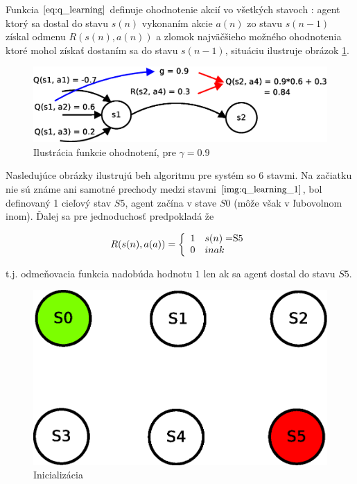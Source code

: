 Funkcia $\ref{eq:q_learning}$ definuje ohodnotenie akcií vo všetkých stavoch :
agent ktorý sa dostal do stavu $s(n)$ vykonaním akcie $a(n)$ zo stavu
$s(n-1)$ získal odmenu $R(s(n),a(n))$ a zlomok najväčšieho možného ohodnotenia ktoré
mohol získať dostaním sa do stavu $s(n-1)$, situáciu ilustruje obrázok \ref{img:q_learning}.


\begin{figure}[!htb]
\center
\includegraphics[scale=.6]{../diagrams/q_learning_detail.eps}
\caption{Ilustrácia funkcie ohodnotení, pre $\gamma = 0.9$}
\label{img:q_learning}
\end{figure}

Nasledujúce obrázky ilustrujú beh algoritmu pre systém so 6 stavmi.
Na začiatku nie sú známe ani samotné prechody medzi stavmi $\ref{img:q_learning_1}$, bol definovaný
1 cieľový stav $S5$, agent začína v stave $S0$ (môže však v ľubovolnom inom).
Ďalej sa pre jednoduchosť predpokladá že

\begin{equation}
R(s(n), a(a)) =
\left\{
	\begin{array}{ll}
		1  & s(n) = $S5$ \\
		0 & inak
	\end{array}
\right.
\end{equation}

t.j. odmeňovacia funkcia nadobúda hodnotu $1$ len ak sa agent dostal do stavu
$S5$.

\begin{figure}[!htb]
\center
\includegraphics[scale=.6]{../diagrams/q_learning_table_01.eps}
\caption{Inicializácia}
\label{img:q_learning_1}
\end{figure}

